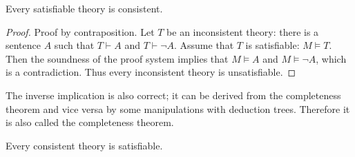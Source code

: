 \begin{page}
\setcounter{section}{3}
\setcounter{subsection}{2}
\setcounter{dfn}{20}
\label{portion:636}

\begin{lem}
\label{lem:SatConsist}
Every satisfiable theory is consistent.
\end{lem}

\end{page}

\begin{page}
\setcounter{section}{3}
\setcounter{subsection}{2}
\setcounter{dfn}{20}
\label{portion:637}

\begin{proof}
Proof by contraposition.
Let $T$ be an inconsistent theory: there is a sentence $A$ such that $T \vdash A$ and $T \vdash \neg A$.
Assume that $T$ is satisfiable: $M \vDash T$.
Then the soundness of the proof system implies that $M \vDash A$ and $M \vDash \neg A$, which is a contradiction.
Thus every inconsistent theory is unsatisfiable.
\end{proof}

The inverse implication is also correct; it can be derived from the completeness theorem and vice versa by some manipulations with deduction trees.
Therefore it is also called the completeness theorem.


\end{page}

\begin{page}
\setcounter{section}{3}
\setcounter{subsection}{2}
\setcounter{dfn}{21}
\label{portion:639}

\begin{thm}
\label{thm:Complete2}
Every consistent theory is satisfiable.
\end{thm}

\end{page}

\begin{page}
\setcounter{section}{3}
\setcounter{subsection}{2}
\setcounter{dfn}{21}
\label{portion:640}

% 

\end{page}

\begin{page}
\setcounter{section}{3}
\setcounter{subsection}{2}
\setcounter{dfn}{22}
\label{portion:642}


\end{page}

